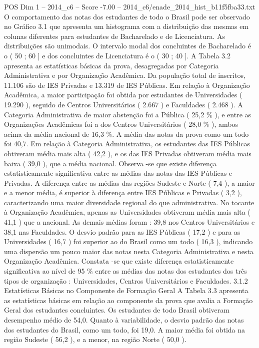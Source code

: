 \begin{textsample}{POS Dim 1 – 2014\_c6 – Score -7.00 – 2014\_c6/enade\_2014\_hist\_b11f5fba33.txt}
O comportamento das notas dos estudantes de todo o Brasil pode ser observado no Gráfico 3.1 que apresenta um histograma com a distribuição das mesmas em colunas diferentes para estudantes de Bacharelado e de Licenciatura.
As distribuições são unimodais.
O intervalo modal dos concluintes de Bacharelado é o ( 50 ; 60 ] e dos concluintes de Licenciatura é o ( 30 ; 40 ].
A Tabela 3.2 apresenta as estatísticas básicas da prova, desagregadas por Categoria Administrativa e por Organização Acadêmica.
Da população total de inscritos, 11.106 são de IES Privadas e 13.319 de IES Públicas.
Em relação à Organização Acadêmica, a maior participação foi obtida por estudantes de Universidades ( 19.290 ), seguido de Centros Universitários ( 2.667 ) e Faculdades ( 2.468 ).
A Categoria Administrativa de maior abstenção foi a Pública ( 25,2 \% ), e entre as Organizações Acadêmicas foi a dos Centros Universitários ( 28,0 \% ), ambos acima da média nacional de 16,3 \%.
A média das notas da prova como um todo foi 40,7.
Em relação à Categoria Administrativa, os estudantes das IES Públicas obtiveram média mais alta ( 42,2 ), e os das IES Privadas obtiveram média mais baixa ( 39,0 ), que a média nacional.
Observa -se que existe diferença estatisticamente significativa entre as médias das notas das IES Públicas e Privadas.
A diferença entre as médias das regiões Sudeste e Norte ( 7,4 ), a maior e a menor média, é superior à diferença entre IES Públicas e Privadas ( 3,2 ), caracterizando uma maior diversidade regional do que administrativa.
No tocante à Organização Acadêmica, apenas as Universidades obtiveram média mais alta ( 41,1 ) que a nacional.
As demais médias foram : 39,8 nos Centros Universitários e 38,1 nas Faculdades.
O desvio padrão para as IES Públicas ( 17,2 ) e para as Universidades ( 16,7 ) foi superior ao do Brasil como um todo ( 16,3 ), indicando uma dispersão um pouco maior das notas nesta Categoria Administrativa e nesta Organização Acadêmica.
Constata -se que existe diferença estatisticamente significativa ao nível de 95 \% entre as médias das notas dos estudantes dos três tipos de organização : Universidades, Centros Universitários e Faculdades. 3.1.2 Estatísticas Básicas no Componente de Formação Geral A Tabela 3.3 apresenta as estatísticas básicas em relação ao componente da prova que avalia a Formação Geral dos estudantes concluintes.
Os estudantes de todo Brasil obtiveram desempenho médio de 54,0.
Quanto à variabilidade, o desvio padrão das notas dos estudantes do Brasil, como um todo, foi 19,0.
A maior média foi obtida na região Sudeste ( 56,2 ), e a menor, na região Norte ( 50,0 ).

\end{textsample}
